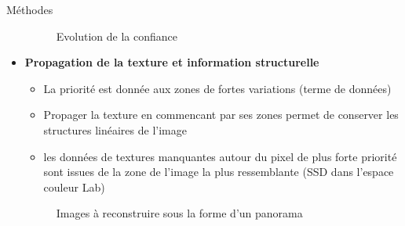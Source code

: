 \documentclass[final,hyperref={pdfpagelabels=false}]{beamer}
\begin{document}
\begin{frame}[t]
\begin{columns}[t]
\begin{column}{.465\textwidth}
\begin{block}{\Large Méthodes}
\begin{itemize}
\begin{figure}[H]
\centering
{}
\caption{Evolution de la confiance}
\end{figure}



\item \textbf{Propagation de la texture et information structurelle}
\begin{itemize}
\item La priorité est donnée aux zones de fortes variations (terme de données)
\item Propager la texture en commencant par ses zones permet de conserver les structures linéaires de l'image
\item les données de textures manquantes autour du pixel de plus forte priorité sont issues de la zone de l'image la plus ressemblante (SSD dans l'espace couleur Lab)
\end{itemize}

\begin{figure}[H]
\centering
{}
\caption{Images à reconstruire sous la forme d'un panorama}
\end{figure}
 

\end{itemize}
\end{block}
\end{column}
\end{columns}
\end{frame}
\end{document}
